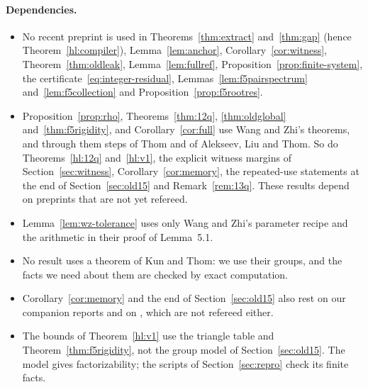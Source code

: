 \documentclass[11pt]{article}
\begin{document}
\paragraph{Dependencies.}
\begin{itemize}
\item No recent preprint is used in Theorems~\ref{thm:extract} and~\ref{thm:gap} (hence Theorem~\ref{hl:compiler}), Lemma~\ref{lem:anchor}, Corollary~\ref{cor:witness}, Theorem~\ref{thm:oldleak}, Lemma~\ref{lem:fullref}, Proposition~\ref{prop:finite-system}, the certificate~\eqref{eq:integer-residual}, Lemmas~\ref{lem:f5pairspectrum} and~\ref{lem:f5collection} and Proposition~\ref{prop:f5rootres}.
\item Proposition~\ref{prop:rho}, Theorems~\ref{thm:12q}, \ref{thm:oldglobal} and~\ref{thm:f5rigidity}, and Corollary~\ref{cor:full} use Wang and Zhi's theorems, and through them steps of Thom and of Alekseev, Liu and Thom.  So do Theorems~\ref{hl:12q} and~\ref{hl:v1}, the explicit witness margins of Section~\ref{sec:witness}, Corollary~\ref{cor:memory}, the repeated-use statements at the end of Section~\ref{sec:old15} and Remark~\ref{rem:13q}.  These results depend on preprints that are not yet refereed.
\item Lemma~\ref{lem:wz-tolerance} uses only Wang and Zhi's parameter recipe and the arithmetic in their proof of Lemma~5.1.
\item No result uses a theorem of Kun and Thom: we use their groups, and the facts we need about them are checked by exact computation.
\item Corollary~\ref{cor:memory} and the end of Section~\ref{sec:old15} also rest on our companion reports \cite{DouglasMghirbiCausal,DouglasMghirbiC} and on \cite[Proposition~K.3]{MghirbiDouglasV1}, which are not refereed either.
\item The bounds of Theorem~\ref{hl:v1} use the triangle table and Theorem~\ref{thm:f5rigidity}, not the group model of Section~\ref{sec:old15}.  The model gives factorizability; the scripts of Section~\ref{sec:repro} check its finite facts.
\end{itemize}
\end{document}
